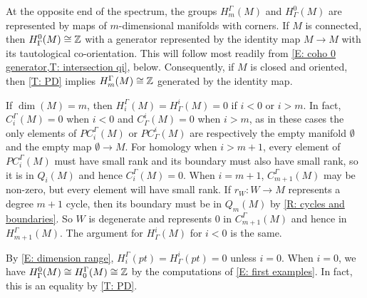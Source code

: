 \begin{example}
	At the opposite end of the spectrum, the groups $H_m^\Gamma(M)$ and $H^0_\Gamma(M)$ are represented by maps of $m$-dimensional manifolds with corners.
	If $M$ is connected, then $H^0_\Gamma(M) \cong \mathbb{Z}$ with a generator represented by the identity map $M \to M$ with its tautological co-orientation.
	This will follow most readily from \cref{E: coho 0 generator,T: intersection qi}, below.
	Consequently, if $M$ is closed and oriented, then  \cref{T: PD} implies $H_m^\Gamma(M) \cong \mathbb{Z}$ generated by the identity map.
\end{example}

\begin{example}\label{E: dimension range}
	If $\dim(M) = m$, then $H_i^\Gamma(M) = H^i_\Gamma(M) = 0$ if $i < 0$ or $i > m$.
	In fact, $C_i^\Gamma(M) = 0$ when $i<0$ and $C^i_\Gamma(M) = 0$ when $i > m$, as in these cases the only elements of $PC_i^\Gamma(M)$ or $PC^i_\Gamma(M)$ are respectively the empty manifold $\emptyset$ and the empty map $\emptyset \to M$.
	For homology when $i>m+1$, every element of $PC_i^\Gamma(M)$ must have small rank and its boundary must also have small rank, so it is in $Q_i(M)$ and hence $C_i^\Gamma(M) = 0$.
	When $i = m+1$, $C_{m+1}^\Gamma(M)$ may be non-zero, but every element will have small rank.
	If $r_W \colon W \to M$ represents a degree $m+1$ cycle, then its boundary must be in $Q_m(M)$ by \cref{R: cycles and boundaries}.
	So $W$ is degenerate and represents $0$ in $C_{m+1}^\Gamma(M)$ and hence in $H_{m+1}^\Gamma(M)$.
	The argument for $H^i_\Gamma(M)$ for $i<0$ is the same.
\end{example}



\begin{example}\label{E: dimension}
	By \cref{E: dimension range}, $H_i^\Gamma(pt) = H^i_\Gamma(pt) = 0$ unless $i = 0$.
	When $i = 0$, we have $H^0_\Gamma(M) \cong H_0^\Gamma(M) \cong \mathbb{Z}$ by the computations of \cref{E: first examples}.
	In fact, this is an equality by \cref{T: PD}.
\end{example}

